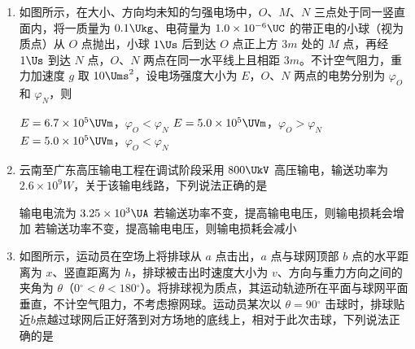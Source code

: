 \begin{enumerate}
\item
如图所示，在大小、方向均未知的匀强电场中，$ O $、$ M $、$ N $ 三点处于同一竖直面内，将一质量为 $ 0.1 \Ukg $、电荷量为 $ 1.0 \times 10 ^{-6} \UC $ 的带正电的小球（视为质点）从 $ O $ 点抛出，小球 $ 1 \Us $ 后到达 $ O $ 点正上方 $ 3m $ 处的 $ M $ 点，再经 $ 1 \Us $ 到达 $ N $ 点，$ O $、$ N $ 两点在同一水平线上且相距 $ 3m $。不计空气阻力，重力加速度 $ g $ 取 $ 10 \Ums ^{2} $，设电场强度大小为 $ E $，$ O $、$ N $ 两点的电势分别为 $ \varphi_{O} $ 和 $ \varphi_{N} $，则 
\begin{figure}[htbp]
	\centering
	
\end{figure}

{$ E =6.7 \times 10 ^{5} \UVm $，$\varphi_{O} < \varphi_{N}$}
{$ E =5.0 \times 10 ^{5} \UVm $，$\varphi_{O} > \varphi_{N}$}
{$ E =5.0 \times 10 ^{5} \UVm $，$\varphi_{O} < \varphi_{N}$}


\item
云南至广东高压输电工程在调试阶段采用 $ 800 \UkV $ 高压输电，输送功率为 $ 2.6 \times 10 ^{9} W $，关于该输电线路，下列说法正确的是 


{输电电流为 $ 3.25 \times 10 ^{3} \UA $}
{若输送功率不变，提高输电电压，则输电损耗会增加}
{若输送功率不变，提高输电电压，则输电损耗会减小}


\item
如图所示，运动员在空场上将排球从 $ a $ 点击出，$ a $ 点与球网顶部 $ b $ 点的水平距离为 $ x $、竖直距离为 $ h $，排球被击出时速度大小为 $ v $、方向与重力方向之间的夹角为 $ \theta $（$ 0 {^\circ} < \theta <180 {^\circ} $）。将排球视为质点，其运动轨迹所在平面与球网平面垂直，不计空气阻力，不考虑擦网球。运动员某次以 $ \theta =90 {^\circ} $ 击球时，排球贴近$ b $点越过球网后正好落到对方场地的底线上，相对于此次击球，下列说法正确的是 


\end{enumerate}
